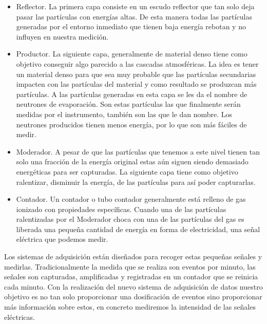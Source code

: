 	\begin{itemize}
		\item   Reflector. La primera capa consiste en un escudo reflector que tan solo deja pasar las partículas con energías altas. De 
		        esta manera todas las partículas generadas por el entorno inmediato que tienen baja energía rebotan y no influyen en nuestra 
			medición. 
		\item   Productor. La siguiente capa, generalmente de material denso tiene como objetivo conseguir algo parecido a las cascadas 
		        atmosféricas. La idea es tener un material denso para que sea muy probable que las partículas secundarias impacten con las partículas 
			del material y como resultado se produzcan más partículas. A las partículas generadas en esta capa se les da el nombre de
			neutrones de evaporación. Son estas partículas las que finalmente serán medidas por el instrumento, también son las que le dan
			nombre. Los neutrones producidos tienen menos energía, por lo que son más fáciles de medir. 
		\item   Moderador. A pesar de que las partículas que tenemos a este nivel tienen tan solo una fracción de la energía original estas
		        aún siguen siendo demasiado energéticas para ser capturadas. La siguiente capa tiene como objetivo ralentizar, disminuir 
			la energía, de las partículas para así poder capturarlas.
		\item   Contador. Un contador o tubo contador generalmente está relleno de gas ionizado con propiedades específicas. Cuando una de 
		  	las partículas ralentizadas por el Moderador choca con una de las partículas del gas es liberada una pequeña cantidad de
			energía en forma de electricidad, una señal eléctrica que podemos medir.
      	\end{itemize}
	Los sistemas de adquisición están diseñados para recoger estas pequeñas señales y medirlas. Tradicionalmente la medida que se realiza son 
	eventos por minuto, las señales son capturadas, amplificadas y registradas en un contador que se reinicia cada minuto. Con la realización
	del nuevo sistema de adquisición de datos nuestro objetivo es no tan solo proporcionar una dosificación de eventos sino proporcionar más 
	información sobre estos, en concreto mediremos la intensidad de las señales eléctricas. 


